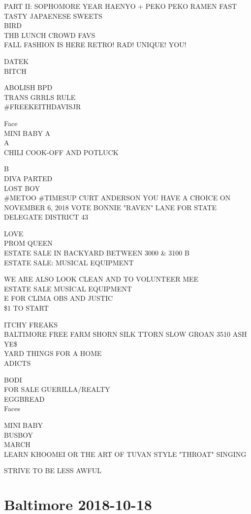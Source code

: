 \documentclass[10pt,letterpaper]{article}
\begin{document}
PART II: SOPHOMORE YEAR HAENYO + PEKO PEKO RAMEN FAST TASTY JAPAENESE SWEETS\\
BIRD\\
THB LUNCH CROWD FAVS\\
FALL FASHION IS HERE RETRO! RAD! UNIQUE! YOU!

DATEK\\
BITCH

ABOLISH BPD\\
TRANS GRRLS RULE\\
\#FREEKEITHDAVISJR

Face\\
MINI BABY A\\
A\\
CHILI COOK{-}OFF AND POTLUCK

B\\
DIVA PARTED\\
LOST BOY\\
\#METOO \#TIMESUP CURT ANDERSON YOU HAVE A CHOICE ON NOVEMBER 6, 2018 VOTE BONNIE "RAVEN" LANE FOR STATE DELEGATE DISTRICT 43

LOVE\\
PROM QUEEN\\
ESTATE SALE IN BACKYARD BETWEEN 3000 \& 3100 B\\
ESTATE SALE: MUSICAL EQUIPMENT

WE ARE ALSO LOOK CLEAN AND TO VOLUNTEER MEE\\
ESTATE SALE MUSICAL EQUIPMENT\\
E FOR CLIMA OBS AND JUSTIC\\
\$1 TO START

ITCHY FREAKS\\
BALTIMORE FREE FARM SHORN SILK TTORN SLOW GROAN 3510 ASH YE\$\\
YARD THINGS FOR A HOME\\
ADICTS

BODI\\
FOR SALE GUERILLA/REALTY\\
EGGBREAD\\
Faces

MINI BABY\\
BUSBOY\\
MARCH\\
LEARN KHOOMEI OR THE ART OF TUVAN STYLE "THROAT" SINGING

STRIVE TO BE LESS AWFUL
\

\section*{Baltimore 2018-10-18}
\end{document}
